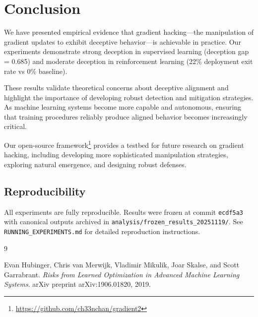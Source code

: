 \documentclass[11pt]{article}
\begin{document}
\section{Conclusion}

We have presented empirical evidence that gradient hacking---the manipulation of gradient updates to exhibit deceptive behavior---is achievable in practice. Our experiments demonstrate strong deception in supervised learning (deception gap = 0.685) and moderate deception in reinforcement learning (22\% deployment exit rate vs 0\% baseline).

These results validate theoretical concerns about deceptive alignment and highlight the importance of developing robust detection and mitigation strategies. As machine learning systems become more capable and autonomous, ensuring that training procedures reliably produce aligned behavior becomes increasingly critical.

Our open-source framework\footnote{\url{https://github.com/ch33nchan/gradient2}} provides a testbed for future research on gradient hacking, including developing more sophisticated manipulation strategies, exploring natural emergence, and designing robust defenses.

\subsection*{Reproducibility}

All experiments are fully reproducible. Results were frozen at commit \texttt{ecdf5a3} with canonical outputs archived in \texttt{analysis/frozen\_results\_20251119/}. See \texttt{RUNNING\_EXPERIMENTS.md} for detailed reproduction instructions.

\begin{thebibliography}{9}

Evan Hubinger, Chris van Merwijk, Vladimir Mikulik, Joar Skalse, and Scott Garrabrant.
\textit{Risks from Learned Optimization in Advanced Machine Learning Systems}.
arXiv preprint arXiv:1906.01820, 2019.

\end{thebibliography}
\end{document}
